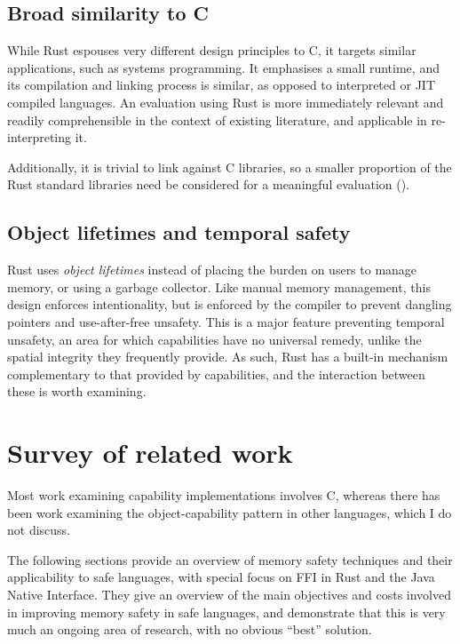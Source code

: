 \documentclass[dissertation.tex]{subfiles}
\begin{document}
\subsection{Broad similarity to C}
While Rust espouses very different design principles to C, it targets
similar applications, such as systems programming.
It emphasises a small runtime, and its compilation and linking process
is similar, as opposed to interpreted or JIT compiled languages.
An evaluation using Rust is more immediately relevant and readily
comprehensible in the context of existing literature, and applicable in
re-interpreting it.

Additionally, it is trivial to link against C libraries, so a smaller
proportion of the Rust standard libraries need be considered for a
meaningful evaluation ().


\subsection{Object lifetimes and temporal safety}
Rust uses \emph{object lifetimes} instead of placing the burden on users
to manage memory, or using a garbage collector.
Like manual memory management, this design enforces intentionality, but
is enforced by the compiler to prevent dangling pointers and
use-after-free unsafety.
This is a major feature preventing temporal unsafety, an area for which
capabilities have no universal remedy, unlike the spatial integrity they
frequently provide.
As such, Rust has a built-in mechanism complementary to that provided by
capabilities, and the interaction between these is worth examining.


\section{Survey of related work}
\label{sec:bg-related}

Most work examining capability implementations involves C, whereas there
has been work examining the object-capability pattern in other languages,
which I do not discuss.

The following sections provide an overview of memory safety techniques
and their applicability to safe languages, with special focus on FFI in
Rust and the Java Native Interface.
They give an overview of the main objectives and costs involved in
improving memory safety in safe languages, and demonstrate that this is
very much an ongoing area of research, with no obvious ``best'' solution.
\end{document}
